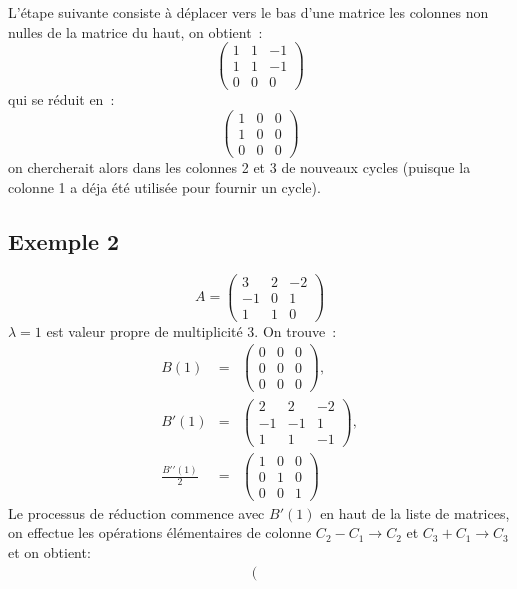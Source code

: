 \documentclass[a4paper,11pt]{book}
\begin{document}
\begin{giacjshere}
L'\'etape suivante consiste \`a d\'eplacer vers le bas d'une matrice les
colonnes non nulles de la matrice du haut, on obtient~:
\[ \left(\begin{array}{ccc}
 1 & 1 & -1 \\
1 & 1 & -1\\
0 & 0 & 0 
\end{array}\right) \]
qui se r\'eduit en~:
\[ \left(\begin{array}{ccc}
 1 & 0 & 0 \\
1 & 0 & 0\\
0 & 0 & 0 
\end{array}\right) \]
on chercherait alors dans les colonnes 2 et 3 de nouveaux cycles (puisque
la colonne 1 a d\'eja \'et\'e utilis\'ee pour fournir un cycle).

\subsection{Exemple 2} \label{sec:ex2}
\[ A=\left(\begin{array}{ccc}
 3 & 2 & -2 \\
-1 &0 &1 \\
1 & 1 & 0 
\end{array}\right) \]
$\lambda =1$ est valeur propre de multiplicit\'e 3.
On trouve~:
\begin{eqnarray*}
B(1)&=&
\left(\begin{array}{ccc}
0 & 0 & 0 \\
0 & 0 & 0 \\
0 & 0 & 0 
\end{array}\right), \\
B'(1)&=&\left(\begin{array}{ccc}
2 & 2&-2 \\
-1 & -1 & 1 \\
1 & 1 & -1 
\end{array}\right), \\
\frac{ B'{'}(1)}{2}
&=& \left(\begin{array}{ccc}
1 & 0 & 0 \\
0 & 1 & 0 \\
0 & 0 & 1 
\end{array}\right)
\end{eqnarray*}
Le processus de r\'eduction commence avec $B'(1)$ en haut de la liste
de matrices, on effectue les op\'erations \'el\'ementaires de
colonne $C_2-C_1\rightarrow C_2$
et $C_3+C_1 \rightarrow C_3$ et on obtient:
\begin{eqnarray*}
\left(\begin{array}{ccc}

\end{array}
\end{eqnarray*}
\end{giacjshere}
\end{document}
